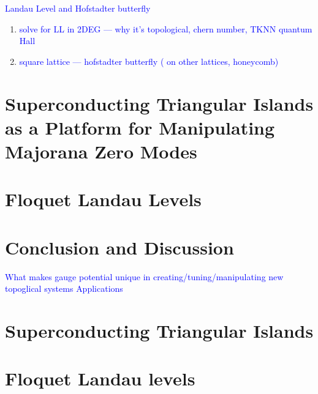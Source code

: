 \documentclass[12pt,doctor]{thesis}
\newcommand{\Blue}[1]{\textcolor{blue}{#1}}
\begin{document}

\item \Blue{Landau Level and Hofstadter butterfly}
\begin{enumerate}[i]
  \item \Blue{solve for LL in 2DEG --- why it's topological, chern number, TKNN quantum Hall}
  \item \Blue{square lattice --- hofstadter butterfly ( on other lattices, honeycomb)}
\end{enumerate}


\chapter{Superconducting Triangular Islands as a Platform for Manipulating Majorana Zero Modes}







\chapter{Floquet Landau Levels}






\chapter{Conclusion and Discussion}

  \Blue{What makes gauge potential unique in creating/tuning/manipulating new topoglical systems}
  \Blue{Applications}


\begin{appendices}

\chapter{Superconducting Triangular Islands}


%

\chapter{Floquet Landau levels}






\end{appendices}



\end{document}
